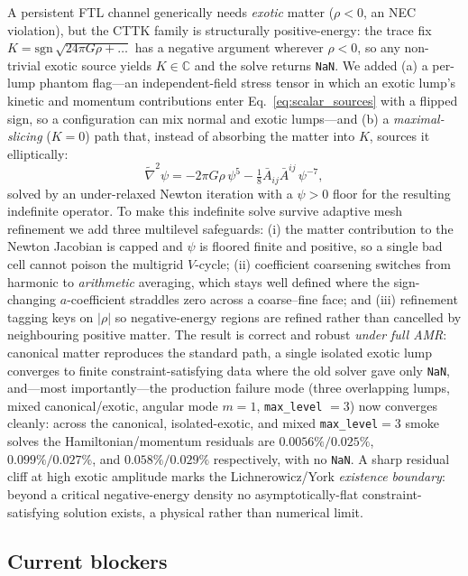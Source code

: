 \documentclass[twocolumn,floatfix,aps,prd,nofootinbib]{revtex4-2}
\begin{document}
A persistent FTL channel generically needs \emph{exotic} matter ($\rho<0$, an
NEC violation), but the \textsc{CTTK} family is structurally positive-energy: the
trace fix $K=\mathrm{sgn}\,\sqrt{24\pi G\rho+\dots}$ has a negative argument
wherever $\rho<0$, so any non-trivial exotic source yields $K\in\mathbb C$ and
the solve returns \texttt{NaN}.  We added (a) a per-lump phantom flag---an
independent-field stress tensor in which an exotic lump's kinetic and momentum
contributions enter Eq.~\eqref{eq:scalar_sources} with a flipped sign, so a
configuration can mix normal and exotic lumps---and (b) a \emph{maximal-slicing}
($K=0$) path that, instead of absorbing the matter into $K$, sources it
elliptically:
\begin{equation}
\tilde\nabla^2\psi=-2\pi G\rho\,\psi^5-\tfrac18\bar A_{ij}\bar A^{ij}\,\psi^{-7},
\label{eq:maximal_slicing}
\end{equation}
solved by an under-relaxed Newton iteration with a $\psi>0$ floor for the
resulting indefinite operator.  To make this indefinite solve survive adaptive
mesh refinement we add three multilevel safeguards: (i) the matter contribution
to the Newton Jacobian is capped and $\psi$ is floored finite and positive, so a
single bad cell cannot poison the multigrid $V$-cycle; (ii) coefficient
coarsening switches from harmonic to \emph{arithmetic} averaging, which stays
well defined where the sign-changing $a$-coefficient straddles zero across a
coarse--fine face; and (iii) refinement tagging keys on $\lvert\rho\rvert$ so
negative-energy regions are refined rather than cancelled by neighbouring
positive matter.  The result is correct and robust \emph{under full AMR}:
canonical matter reproduces the standard path, a single isolated exotic lump
converges to finite constraint-satisfying data where the old solver gave only
\texttt{NaN}, and---most importantly---the production failure mode (three
overlapping lumps, mixed canonical/exotic, angular mode $m=1$, \texttt{max\_level}
$=3$) now converges cleanly: across the canonical, isolated-exotic, and mixed
\texttt{max\_level}$=3$ smoke solves the Hamiltonian/momentum residuals are
$0.0056\%/0.025\%$, $0.099\%/0.027\%$, and $0.058\%/0.029\%$ respectively, with
no \texttt{NaN}.  A sharp residual cliff at high exotic amplitude marks the
Lichnerowicz/York \emph{existence boundary}: beyond a critical negative-energy
density no asymptotically-flat constraint-satisfying solution exists, a physical
rather than numerical limit.

\subsection{Current blockers}
\label{sec:grtresna_blockers}
\end{document}
